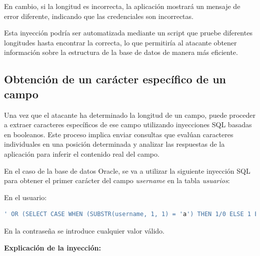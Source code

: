 \documentclass[a4paper,12pt]{article}
\begin{document}
En cambio, si la longitud es incorrecta, la aplicación mostrará un mensaje de error diferente, indicando que las credenciales son incorrectas.

\vspace{0,5cm}

Esta inyección podría ser automatizada mediante un script que pruebe diferentes longitudes hasta encontrar la correcta, lo que permitiría al atacante obtener información sobre la estructura de la base de datos de manera más eficiente.

\vspace{0,5cm}


\subsection{Obtención de un carácter específico de un campo}

Una vez que el atacante ha determinado la longitud de un campo, puede proceder a extraer caracteres específicos de ese campo utilizando inyecciones SQL basadas en booleanos. Este proceso implica enviar consultas que evalúan caracteres individuales en una posición determinada y analizar las respuestas de la aplicación para inferir el contenido real del campo.

\vspace{0,5cm}

En el caso de la base de datos Oracle, se va a utilizar la siguiente inyección SQL para obtener el primer carácter del campo \textit{username} en la tabla \textit{usuarios}:

\vspace{0,5cm}

En el usuario:

\begin{lstlisting}[language=SQL]
' OR (SELECT CASE WHEN (SUBSTR(username, 1, 1) = 'a') THEN 1/0 ELSE 1 END FROM (SELECT username, ROWNUM AS rn FROM Usuarios) WHERE rn=1) = 1 --
\end{lstlisting}

En la contraseña se introduce cualquier valor válido.

\vspace{0,5cm}

\textbf{Explicación de la inyección:}
\end{document}
